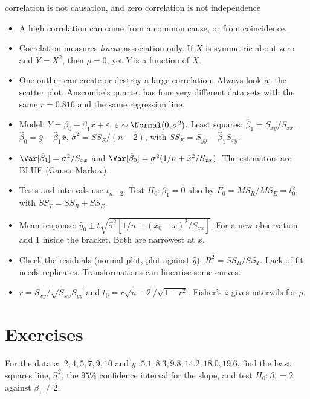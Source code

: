 \begin{pitfall}{correlation is not causation, and zero correlation is not independence}
\begin{itemize}
  \item A high correlation can come from a common cause, or from coincidence.
  \item Correlation measures \emph{linear} association only. If $X$ is symmetric about zero and $Y=X^2$, then $\rho=0$, yet $Y$ is a function of $X$.
  \item One outlier can create or destroy a large correlation. Always look at the scatter plot. Anscombe's quartet has four very different data sets with the same $r=0.816$ and the same regression line.
\end{itemize}
\end{pitfall}

\begin{summarybox}
\begin{itemize}
  \item Model: $Y=\beta_0+\beta_1x+\varepsilon$, $\varepsilon\sim\Normal(0,\sigma^2)$. Least squares: $\hat\beta_1=S_{xy}/S_{xx}$, $\hat\beta_0=\bar{y}-\hat\beta_1\bar{x}$, $\hat\sigma^2=SS_E/(n-2)$, with $SS_E=S_{yy}-\hat\beta_1S_{xy}$.
  \item $\Var[\hat\beta_1]=\sigma^2/S_{xx}$ and $\Var[\hat\beta_0]=\sigma^2(1/n+\bar{x}^2/S_{xx})$. The estimators are BLUE (Gauss--Markov).
  \item Tests and intervals use $t_{n-2}$. Test $H_0:\beta_1=0$ also by $F_0=MS_R/MS_E=t_0^2$, with $SS_T=SS_R+SS_E$.
  \item Mean response: $\hat{y}_0\pm t\sqrt{\hat\sigma^2[1/n+(x_0-\bar{x})^2/S_{xx}]}$. For a new observation add $1$ inside the bracket. Both are narrowest at $\bar{x}$.
  \item Check the residuals (normal plot, plot against $\hat{y}$). $R^2=SS_R/SS_T$. Lack of fit needs replicates. Transformations can linearise some curves.
  \item $r=S_{xy}/\sqrt{S_{xx}S_{yy}}$ and $t_0=r\sqrt{n-2}/\sqrt{1-r^2}$. Fisher's $z$ gives intervals for $\rho$.
\end{itemize}
\end{summarybox}

\section{Exercises}

\begin{exercise}
For the data $x$: $2,4,5,7,9,10$ and $y$: $5.1,8.3,9.8,14.2,18.0,19.6$, find the least squares line, $\hat\sigma^2$, the $95\%$ confidence interval for the slope, and test $H_0:\beta_1=2$ against $\beta_1\ne2$.
\end{exercise}

